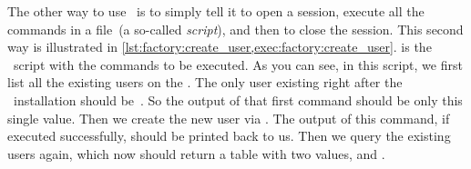 The other way to use \psql\ is to simply tell it to open a session, execute all the commands in a file~(a so-called \emph{script}), and then to close the session.
This second way is illustrated in \cref{lst:factory:create_user,exec:factory:create_user}.
 is the \sql\ script with the commands to be executed.
As you can see, in this script, we first list all the existing users on the \dbms.
The only user existing right after the \postgresql\ installation should be~.
So the output of that first command should be only this single value.
Then we create the new user via .
The output of this command, if executed successfully, should be  printed back to us.
Then we query the existing users again, which now should return a table with two values,  and .
%
